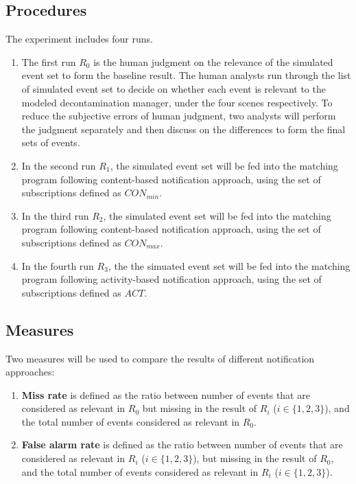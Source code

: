 \subsection{Procedures} %
\label{sub:procedures}
The experiment includes four runs. 
\begin{enumerate}
	\item The first run $R_0$ is the human judgment on the relevance of the simulated event set to form the baseline result. The human analysts run through the list of simulated event set to decide on whether each event is relevant to the modeled decontamination manager, under the four scenes respectively. To reduce the subjective errors of human judgment, two analysts will perform the judgment separately and then discuss on the differences to form the final sets of events.
	\item In the second run $R_1$, the simulated event set will be fed into the matching program following  content-based notification approach, using the set of subscriptions defined as $CON_{min}$.
	\item In the third run $R_2$, the simulated event set will be fed into the matching program following  content-based notification approach, using the set of subscriptions defined as $CON_{max}$.
	\item In the fourth run $R_3$, the the simuated event set will be fed into the matching program following activity-based notification approach, using the set of subscriptions defined as $ACT$.
\end{enumerate}

\subsection{Measures} %
\label{sub:measures}
Two measures will be used to compare the results of different notification approaches:
\begin{enumerate}
	\item \textbf{Miss rate} is defined as the ratio between number of events that are considered as relevant in $R_0$ but missing in the result of $R_i$ ($i \in \{1, 2, 3\}$), and the total number of events considered as relevant in $R_0$.
	\item \textbf{False alarm rate} is defined as the ratio between number of events that are considered as relevant in $R_i$ ($i \in \{1, 2, 3\}$), but missing in the result of $R_0$, and the total number of events considered as relevant in $R_i$ ($i \in \{1, 2, 3\}$).
\end{enumerate}


